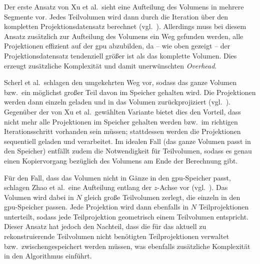 Der erste Ansatz von Xu et al.\ sieht eine Aufteilung des Volumens in mehrere Segmente vor. Jedes Teilvolumen wird dann
durch die Iteration über den kompletten Projektionsdatensatz berechnet (vgl.~\cite{xumuell}). Allerdings muss bei diesem
Ansatz zusätzlich zur Aufteilung des Volumens ein Weg gefunden werden, alle Projektionen effizient auf der \gls{gpu}
abzubilden, da -- wie oben gezeigt -- der Projektionsdatensatz tendenziell größer ist als das komplette Volumen. Dies
erzeugt zusätzliche Komplexität und damit unerwünschten \textit{Overhead}.

Scherl et al.\ schlagen den umgekehrten Weg vor, sodass das ganze Volumen bzw.\ ein möglichst großer Teil davon im
Speicher gehalten wird. Die Projektionen werden dann einzeln geladen und in das Volumen zurückprojiziert
(vgl.~\cite{scherlkeck}). Gegenüber der von Xu et al.\ gewählten Variante bietet dies den Vorteil, dass nicht mehr alle
Projektionen im Speicher gehalten werden bzw.\ im richtigen Iterationsschritt vorhanden sein müssen; stattdessen werden
die Projektionen sequentiell geladen und verarbeitet. Im idealen Fall (das ganze Volumen passt in den Speicher) entfällt
zudem die Notwendigkeit für Teilvolumen, sodass es genau einen Kopiervorgang bezüglich des Volumens am Ende der
Berechnung gibt.

Für den Fall, dass das Volumen nicht in Gänze in den \gls{gpu}-Speicher passt, schlagen Zhao et al.\ eine Aufteilung
entlang der $z$-Achse vor (vgl.~\cite{zhao}). Das Volumen wird dabei in $N$ gleich große Teilvolumen zerlegt, die
einzeln in den \gls{gpu}-Speicher passen. Jede Projektion wird dann ebenfalls in $N$ Teilprojektionen unterteilt, sodass
jede Teilprojektion geometrisch einem Teilvolumen entspricht. Dieser Ansatz hat jedoch den Nachteil, dass die für das
aktuell zu rekonstruierende Teilvolumen nicht benötigten Teilprojektionen verwaltet bzw.\ zwischengespeichert werden
müssen, was ebenfalls zusätzliche Komplexität in den Algorithmus einführt.

